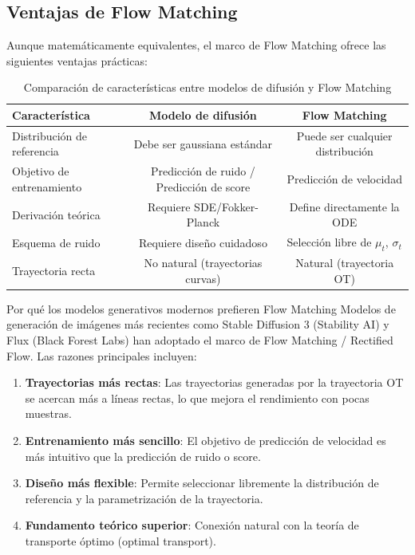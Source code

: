 \subsection{Ventajas de Flow Matching}

Aunque matemáticamente equivalentes, el marco de Flow Matching ofrece las siguientes ventajas prácticas:

\begin{table}[H]
\centering
\begin{tabular}{lcc}
\toprule
\textbf{Característica} & \textbf{Modelo de difusión} & \textbf{Flow Matching} \\
\midrule
Distribución de referencia & Debe ser gaussiana estándar & Puede ser cualquier distribución \\
Objetivo de entrenamiento & Predicción de ruido / Predicción de score & Predicción de velocidad \\
Derivación teórica & Requiere SDE/Fokker-Planck & Define directamente la ODE \\
Esquema de ruido & Requiere diseño cuidadoso & Selección libre de $\mu_t$, $\sigma_t$ \\
Trayectoria recta & No natural (trayectorias curvas) & Natural (trayectoria OT) \\
\bottomrule
\end{tabular}
\caption{Comparación de características entre modelos de difusión y Flow Matching}
\end{table}

\begin{knowledgebox}{Por qué los modelos generativos modernos prefieren Flow Matching}
Modelos de generación de imágenes más recientes como Stable Diffusion 3 (Stability AI) y Flux (Black Forest Labs) han adoptado el marco de Flow Matching / Rectified Flow. Las razones principales incluyen:
\begin{enumerate}
    \item \textbf{Trayectorias más rectas}: Las trayectorias generadas por la trayectoria OT se acercan más a líneas rectas, lo que mejora el rendimiento con pocas muestras.
    \item \textbf{Entrenamiento más sencillo}: El objetivo de predicción de velocidad es más intuitivo que la predicción de ruido o score.
    \item \textbf{Diseño más flexible}: Permite seleccionar libremente la distribución de referencia y la parametrización de la trayectoria.
    \item \textbf{Fundamento teórico superior}: Conexión natural con la teoría de transporte óptimo (optimal transport).
\end{enumerate}
\end{knowledgebox}

